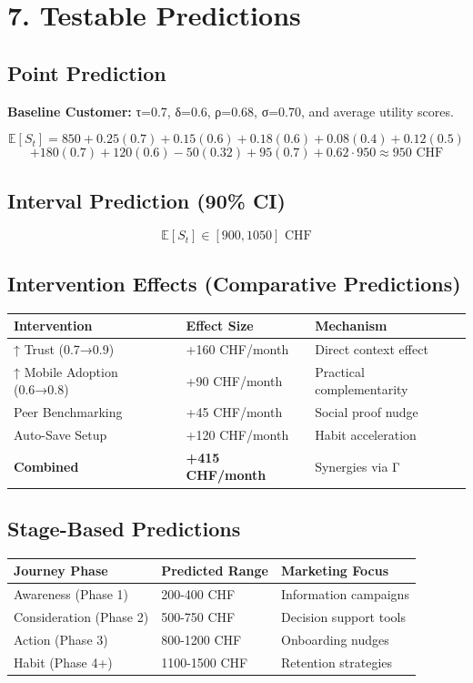\documentclass[11pt,a4paper]{article}
\begin{document}
\section{7. Testable Predictions}

\subsection{Point Prediction}

\textbf{Baseline Customer:} τ=0.7, δ=0.6, ρ=0.68, σ=0.70, and average utility scores.

\[
\mathbb{E}[S_t] = 850 + 0.25(0.7) + 0.15(0.6) + 0.18(0.6) + 0.08(0.4) + 0.12(0.5)
\]
\[
+ 180(0.7) + 120(0.6) - 50(0.32) + 95(0.7) + 0.62 \cdot 950 \approx \boxed{950 \text{ CHF}}
\]

\subsection{Interval Prediction (90\% CI)}

\[
\mathbb{E}[S_t] \in [900, 1050] \text{ CHF}
\]

\subsection{Intervention Effects (Comparative Predictions)}

\begin{tabular}{lll}
\toprule
Intervention & Effect Size & Mechanism \\
\midrule
↑ Trust (0.7→0.9) & +160 CHF/month & Direct context effect \\
↑ Mobile Adoption (0.6→0.8) & +90 CHF/month & Practical complementarity \\
Peer Benchmarking & +45 CHF/month & Social proof nudge \\
Auto-Save Setup & +120 CHF/month & Habit acceleration \\
\textbf{Combined} & \textbf{+415 CHF/month} & Synergies via Γ \\
\bottomrule
\end{tabular}

\subsection{Stage-Based Predictions}

\begin{tabular}{lll}
\toprule
Journey Phase & Predicted Range & Marketing Focus \\
\midrule
Awareness (Phase 1) & 200-400 CHF & Information campaigns \\
Consideration (Phase 2) & 500-750 CHF & Decision support tools \\
Action (Phase 3) & 800-1200 CHF & Onboarding nudges \\
Habit (Phase 4+) & 1100-1500 CHF & Retention strategies \\
\bottomrule
\end{tabular}
\end{document}
